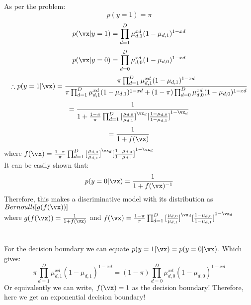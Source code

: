 \documentclass[a4paper,11pt]{article}
\begin{document}
\begin{mlsolution}

\noindent
As per the problem:
\begin{equation}
  p(y=1) = \pi
\end{equation}
\begin{equation}
  p(\vx|y=1) = \prod_{d=1}^{D}\mu_{d,1}^{xd}(1 - \mu_{d,1})^{1 - xd}
\end{equation}
\begin{equation}
  p(\vx|y=0) = \prod_{d=0}^{D}\mu_{d,0}^{xd}(1 - \mu_{d,0})^{1 - xd}
\end{equation}
\begin{equation}
  \therefore p(y=1|\vx) = \frac{\pi\prod_{d=1}^{D}\mu_{d,1}^{xd}(1 - \mu_{d,1})^{1 - xd}}{\pi\prod_{d=1}^{D}\mu_{d,1}^{xd}(1 - \mu_{d,1})^{1 - xd} +
  (1-\pi)\prod_{d=0}^{D}\mu_{d,0}^{xd}(1 - \mu_{d,0})^{1 - xd}}
\end{equation}
\begin{equation}
  = \frac{1}{1 + \frac{1-\pi}{\pi}\prod_{d=1}^{D}{[\frac{\mu_{d,0}}{\mu_{d,1}}]}^{\vx_{d}}
  {[\frac{1 - \mu_{d,0}}{1-\mu_{d,1}}]}^{1-\vx_{d}} }
\end{equation}
\begin{equation}
  = \frac{1}{1+f(\vx)}
\end{equation}
where $f(\vx) = \frac{1-\pi}{\pi}\prod_{d=1}^{D}{[\frac{\mu_{d,0}}{\mu_{d,1}}]}^{\vx_{d}}
{[\frac{1 - \mu_{d,0}}{1-\mu_{d,1}}]}^{1-\vx_{d}}$
\\It can be easily shown that:
\begin{equation}
  p(y=0|\vx) = \frac{1}{1+f(\vx)^{-1}}
\end{equation}
Therefore, this makes a discriminative model with its distribution as $Bernoulli[g(f(\vx))]$
\\where $g(f(\vx)) = \frac{1}{1+f(\vx)}$ and $f(\vx) = \frac{1-\pi}{\pi}\prod_{d=1}^{D}{[\frac{\mu_{d,0}}{\mu_{d,1}}]}^{\vx_{d}}
{[\frac{1 - \mu_{d,0}}{1-\mu_{d,1}}]}^{1-\vx_{d}}$
\\
\\
\\For the decision boundary we can equate $p(y=1|\vx) = p(y=0|\vx)$. Which gives:
\begin{equation}
  \pi\prod_{d=1}^{D}\mu_{d,1}^{xd}(1 - \mu_{d,1})^{1 - xd} =
  (1-\pi)\prod_{d=0}^{D}\mu_{d,0}^{xd}(1 - \mu_{d,0})^{1 - xd}
\end{equation}
Or equivalently we can write, $f(\vx) = 1$ as the decision boundary! Therefore, here we get an exponential decision boundary!

\end{mlsolution}
\end{document}
